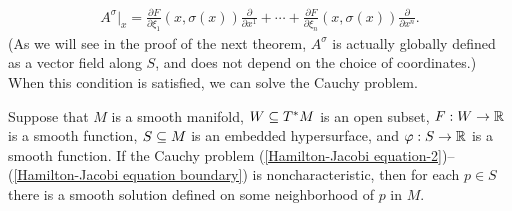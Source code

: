 \begin{align}\label{Hamilton-Jacobi equation vector field}
A^\sigma|_x=\frac{\partial F}{\partial\xi_1}(x,\sigma(x))\frac{\partial}{\partial x^1}+\cdots+\frac{\partial F}{\partial\xi_n}(x,\sigma(x))\frac{\partial}{\partial x^n}.
\end{align}
(As we will see in the proof of the next theorem, $A^\sigma$ is actually globally defined as a vector field along $S$, and does not depend on the choice of coordinates.) When this condition is satisfied, we can solve the Cauchy problem.

\begin{theorem}\label{Hamilton-Jacobi equation solution}
Suppose that $M$ is a smooth manifold, $W\subseteq T^*M$ is an open subset, $F:W\to\mathbb{R}$ is a smooth function, $S\subseteq M$ is an embedded hypersurface, and $\varphi:S\to\mathbb{R}$ is a smooth function. If the Cauchy problem (\ref{Hamilton-Jacobi equation-2})--(\ref{Hamilton-Jacobi equation boundary}) is noncharacteristic, then for each $p\in S$ there is a smooth solution defined on some neighborhood of $p$ in $M$.
\end{theorem}
